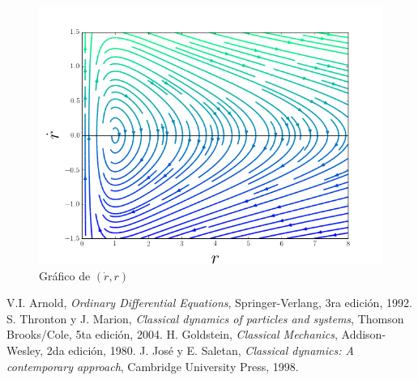 \documentclass[a4paper,10pt]{article}
\numberwithin{equation}{section}
\begin{document}
\begin{figure}[H]
 \center 
 \includegraphics[scale=0.5]{problema5fig7}
 \caption{Gráfico de $(\dot{r},r)$}
 \label{fig:rDotR}
\end{figure}


\begin{thebibliography}{10}
 V.I. Arnold, \emph{Ordinary Differential Equations}, Springer-Verlang,
 3ra edición, 1992.
 S. Thronton y J. Marion, \textit{Classical dynamics of particles and systems}, Thomson Brooks/Cole,
 5ta edición, 2004.
 H. Goldstein, \emph{Classical Mechanics}, Addison-Wesley, 2da edición,
 1980.
 J. José y E. Saletan, \emph{Classical dynamics: A contemporary approach}, Cambridge University Press,
 1998.
\end{thebibliography}
\end{document}
